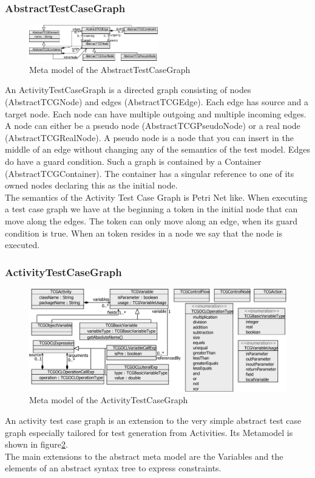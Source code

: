 \subsubsection{AbstractTestCaseGraph}
\begin{figure}
\label{fig:AbstractTCGMetaModel}
\includegraphics[width=0.5\textwidth]{./pics/AbstractTestCaseGraph.pdf}
\caption{Meta model of the AbstractTestCaseGraph}
\end{figure}
An ActivityTestCaseGraph is a directed graph consisting of nodes (AbstractTCGNode) and edges (AbstractTCGEdge). Each edge has source and a target node. Each node can have multiple outgoing and multiple incoming edges.
A node can either be a pseudo node (AbstractTCGPseudoNode) or a real node (AbstractTCGRealNode). A pseudo node is a node that you can insert in the middle of an edge without changing any of the semantics of the test model. Edges do have a guard condition. Such a graph is contained by a Container (AbstractTCGContainer). The container has a singular reference to one of its owned nodes declaring this as the initial node. \\
The semantics of the Activity Test Case Graph is Petri Net like. When executing a test case graph we have at the beginning a token in the initial node that can move along the edges. The token can only move along an edge, when its guard condition is true. When an token resides in a node we say that the node is executed.

\subsubsection{ActivityTestCaseGraph}
\begin{figure}
\label{fig:ActivityTCGMetaModel}
\includegraphics[width=\textwidth]{./pics/ActivityTestCaseGraph.pdf}
\caption{Meta model of the ActivityTestCaseGraph}
\end{figure}
An activity test case graph is an extension to the very simple abstract test case graph especially tailored for test generation from Activities. Its Metamodel is shown in figure\ref{fig:ActivityTCGMetaModel}.\\
The main extensions to the abstract meta model are the Variables and the elements of an abstract syntax tree to express constraints.

